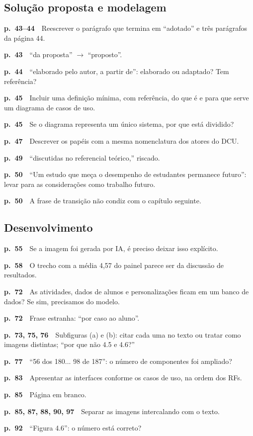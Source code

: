 \documentclass[11pt,a4paper]{article}
\newcommand{\pg}[1]{\textbf{p.~#1}\ \ }
\begin{document}
\subsection*{Solução proposta e modelagem}
\begin{checklist}
  \item \pg{43--44}Reescrever o parágrafo que termina em “adotado” e três parágrafos da página 44.
  \item \pg{43}“da proposta” $\rightarrow$ “proposto”.
  \item \pg{44}“elaborado pelo autor, a partir de”: elaborado ou adaptado? Tem referência?
  \item \pg{45}Incluir uma definição mínima, com referência, do que é e para que serve um diagrama de casos de uso.
  \item \pg{45}Se o diagrama representa um único sistema, por que está dividido?
  \item \pg{47}Descrever os papéis com a mesma nomenclatura dos atores do DCU.
  \item \pg{49}“discutidas no referencial teórico,” riscado.
  \item \pg{50}“Um estudo que meça o desempenho de estudantes permanece futuro”: levar para as considerações como trabalho futuro.
  \item \pg{50}A frase de transição não condiz com o capítulo seguinte.
\end{checklist}
\subsection*{Desenvolvimento}
\begin{checklist}
  \item \pg{55}Se a imagem foi gerada por IA, é preciso deixar isso explícito.
  \item \pg{58}O trecho com a média 4,57 do painel parece ser da discussão de resultados.
  \item \pg{72}As atividades, dados de alunos e personalizações ficam em um banco de dados? Se sim, precisamos do modelo.
  \item \pg{72}Frase estranha: “por caso ao aluno”.
  \item \pg{73, 75, 76}Subfiguras (a) e (b): citar cada uma no texto ou tratar como imagens distintas; “por que não 4.5 e 4.6?”
  \item \pg{77}“56 dos 180... 98 de 187”: o número de componentes foi ampliado?
  \item \pg{83}Apresentar as interfaces conforme os casos de uso, na ordem dos RFs.
  \item \pg{85}Página em branco.
  \item \pg{85, 87, 88, 90, 97}Separar as imagens intercalando com o texto.
  \item \pg{92}“Figura 4.6”: o número está correto?
\end{checklist}
\end{document}
